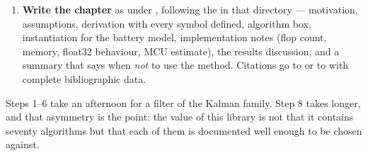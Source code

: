 \begin{enumerate}[leftmargin=*,topsep=2pt,itemsep=3pt]
\item \textbf{Write the chapter} as  under ,
following the  in that directory --- motivation, assumptions, derivation with every symbol
defined, algorithm box, instantiation for the battery model, implementation notes (flop count,
memory, float32 behaviour, MCU estimate), the results discussion, and a summary that says when
\emph{not} to use the method. Citations go to  or to
 with complete bibliographic data.
\end{enumerate}

Steps 1--6 take an afternoon for a filter of the Kalman family. Step 8 takes longer, and that
asymmetry is the point: the value of this library is not that it contains seventy algorithms but
that each of them is documented well enough to be chosen against.
